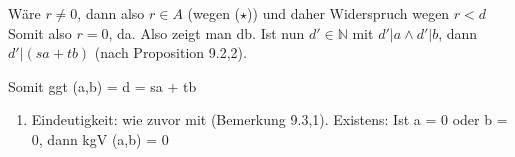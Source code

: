 \documentclass{../../meta/tudscript}
\begin{document}
Wäre \(r \neq 0\), dann also \(r \in A\) (wegen (\(\star\))) und daher
Widerspruch wegen \(r < d\) Somit also \(r = 0\), d\textbar{}a. Also
zeigt man d\textbar{}b. Ist nun \(d' \in \mathbb{N}\) mit
\(d'|a \land d'|b\), dann \(d'| (sa+tb)\) (nach Proposition 9.2,2).

Somit ggt (a,b) = d = sa + tb

\begin{enumerate}
    \def\labelenumi{\arabic{enumi}}
\setcounter{enumi}{1}

\item
  Eindeutigkeit: wie zuvor mit (Bemerkung 9.3,1). Existens: Ist a = 0
  oder b = 0, dann kgV (a,b) = 0
\end{enumerate}
\end{document}
